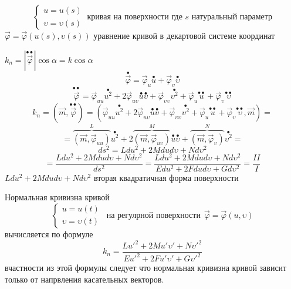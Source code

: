 \begin{define}
  $$
  \left\{
  \begin{array}{c}
    u = u(s) \\
    \upsilon = \upsilon(s)
  \end{array}
  \right. ~ \text{кривая на поверхности где $s$ натуральный параметр}
  $$
  $\vec \varphi = \vec \varphi(u(s), \upsilon(s))$ уравнение кривой в декартовой
  системе координат

  $k_n = |\stackrel{\bullet \bullet}{\vec \varphi}| \cos \alpha = k \cos \alpha$
  $$
  \stackrel{\bullet}{\vec \varphi} = \vec \varphi_u \stackrel{\bullet}{u} +
  \vec \varphi_{\upsilon} \stackrel{\bullet}{\upsilon}
  $$
  $$
  \stackrel{\bullet \bullet}{\vec \varphi} = \vec \varphi_{uu}
  \stackrel{\bullet}{u^2} + 2\vec \varphi_{u\upsilon}\stackrel{\bullet}{u}
  \stackrel{\bullet}{\upsilon} + \vec \varphi_{\upsilon \upsilon}
  \stackrel{\bullet}{\upsilon^2}
  + \vec \varphi_u \stackrel{\bullet \bullet}{u} +
  \vec \varphi_{\upsilon} \stackrel{\bullet \bullet}{\upsilon}
  $$
  $$
  k_n = (\vec m, \stackrel{\bullet \bullet}{\vec \varphi}) = (\vec \varphi_{uu}
  \stackrel{\bullet}{u^2} + 2\vec \varphi_{u\upsilon}\stackrel{\bullet}{u}
  \stackrel{\bullet}{\upsilon} + \vec \varphi_{\upsilon \upsilon}
  \stackrel{\bullet}{\upsilon^2}
  + \vec \varphi_u \stackrel{\bullet \bullet}{u} +
  \vec \varphi_{\upsilon} \stackrel{\bullet \bullet}{\upsilon}, \vec m) =
  $$
  $$
  = \overbrace{(\vec m, \vec \varphi_{uu})}^L \stackrel{\bullet}{u^2} +
  2\overbrace{(\vec m, \vec \varphi_{u\upsilon})}^M \stackrel{\bullet}{u}
  \stackrel{\bullet}{\upsilon} + \overbrace{(\vec m, \vec \varphi_{\upsilon})}^N
  \stackrel{\bullet}{\upsilon^2} =
  $$
  $$
  ds^2 = Ldu^2 + 2Mdud\upsilon + Nd\upsilon^2
  $$
  $$
  = \frac{Ldu^2 + 2Mdud\upsilon + Nd\upsilon^2}{ds^2}
  = \frac{Ldu^2 + 2Mdud\upsilon + Nd\upsilon^2}{Edu^2 + 2Fdu d\upsilon +
  Gd\upsilon^2} = \frac{II}{I}
  $$
  $Ldu^2 + 2M dud\upsilon + Nd\upsilon^2$ вторая квадратичная форма поверхности
\end{define}

\begin{block}
  Нормальная кривизна кривой
  $$
  \left\{
  \begin{array}{c}
    u = u(t) \\
    \upsilon = \upsilon(t)
  \end{array}
  \right. ~~ \text{на регулрной поверхности} ~~ \vec \varphi = \vec \varphi(u,
  \upsilon)
  $$
  вычисляется по формуле
  $$
  k_n = \frac{Lu'^2 + 2Mu'\upsilon' + N\upsilon'^2}{Eu'^2 + 2Fu'\upsilon' +
  G\upsilon'^2}
  $$
  вчастности из этой формулы следует что нормальная кривизна кривой зависит
  только от напрвления касательных векторов.
\end{block}

